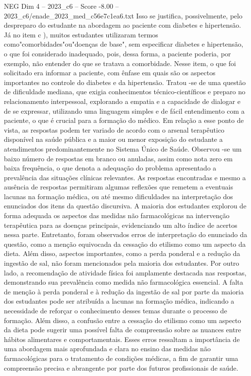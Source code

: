 \begin{textsample}{NEG Dim 4 – 2023\_c6 – Score -8.00 – 2023\_c6/enade\_2023\_med\_c56e7c1ea6.txt}
Isso se justifica, possivelmente, pelo despreparo do estudante na abordagem ao paciente com diabetes e hipertensão.
Já no item c ), muitos estudantes utilizaram termos como"comorbidades"ou"doenças de base", sem especificar diabetes e hipertensão, o que foi considerado inadequado, pois, dessa forma, a paciente poderia, por exemplo, não entender do que se tratava a comorbidade.
Nesse item, o que foi solicitado era informar a paciente, com ênfase em quais são os aspectos importantes no controle do diabetes e da hipertensão.
Tratou -se de uma questão de dificuldade mediana, que exigia conhecimentos técnico-científicos e preparo no relacionamento interpessoal, explorando a empatia e a capacidade de dialogar e de se expressar, utilizando uma linguagem simples e de fácil entendimento com a paciente, o que é crucial para a formação do médico.
Em relação a esse ponto de vista, as respostas podem ter variado de acordo com o arsenal terapêutico disponível na saúde pública e a maior ou menor exposição do estudante a atendimentos predominantemente no Sistema Único de Saúde.
Observou -se um baixo número de respostas em branco ou anuladas, assim como nota zero em baixa frequência, o que denota a adequação do problema apresentado a prevalência das situações clínicas relevantes.
As respostas encontradas e mesmo a ausência de respostas permitiram algumas reflexões que remetem a eventuais lacunas na formação médica, ou até mesmo dificuldades na interpretação dos enunciados dos itens da questão discursiva.
A maioria dos estudantes explorou de forma adequada os aspectos das medidas não farmacológicas na intervenção terapêutica para as doenças principais, evidenciando um alto índice de acertos nessa parte.
Entretanto, foram observados erros de interpretação do enunciado da questão, como a menção equivocada da cessação do etilismo como um aspecto da dieta.
Além disso, aspectos importantes, como a perda ponderal e a redução da ingestão de sal, não foram mencionados pela maioria dos estudantes.
Por outro lado, a recomendação de atividade física foi amplamente destacada nas respostas, demonstrando sua prevalência como medida não farmacológica essencial.
A falta de menção à perda ponderal e à redução da ingestão de sal por parte da maioria dos estudantes pode ser atribuída a lacunas na formação médica, indicando a necessidade de reforçar o conhecimento desses temas durante o processo de formação.
Além disso, a confusão entre a cessação do etilismo como um aspecto da dieta pode sugerir uma possível falta de compreensão sobre as nuances entre hábitos alimentares e comportamentais.
Esses erros ressaltam a importância de uma abordagem mais aprofundada e clara no ensino das medidas não farmacológicas para o tratamento de condições médicas, a fim de garantir uma compreensão precisa e abrangente por parte dos futuros profissionais de saúde.

\end{textsample}
